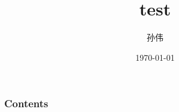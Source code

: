 \documentclass{beamer}
\begin{document}
  \title{test}
  \author{孙伟}
  \date{\today}
  \begin{frame} 
    \titlepage
  \end{frame}
  \begin{frame} \frametitle{Contents}
    \tableofcontents
  \end{frame}
\end{document}

